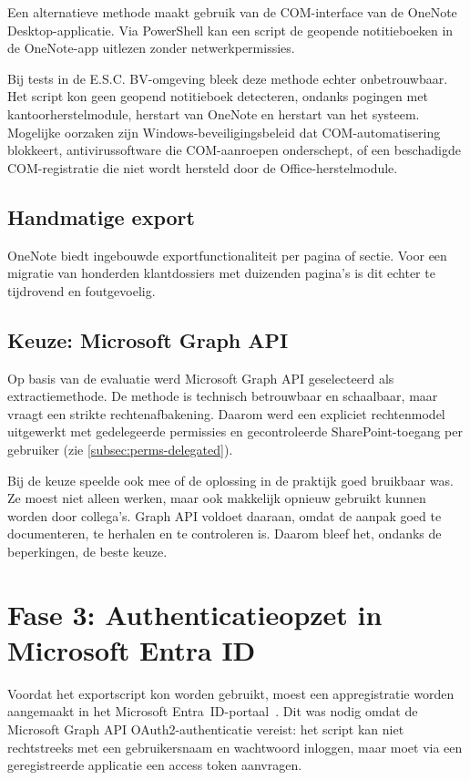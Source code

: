 Een alternatieve methode maakt gebruik van de COM-interface van de OneNote Desktop-applicatie. Via PowerShell kan een script de geopende notitieboeken in de OneNote-app uitlezen zonder netwerkpermissies.

Bij tests in de E.S.C. BV-omgeving bleek deze methode echter onbetrouwbaar. Het script kon geen geopend notitieboek detecteren, ondanks pogingen met kantoorherstelmodule, herstart van OneNote en herstart van het systeem. Mogelijke oorzaken zijn Windows-beveiligingsbeleid dat COM-automatisering blokkeert, antivirussoftware die COM-aanroepen onderschept, of een beschadigde COM-registratie die niet wordt hersteld door de Office-herstelmodule.

\subsection{Handmatige export}
\label{subsec:methode-manueel}

OneNote biedt ingebouwde exportfunctionaliteit per pagina of sectie. Voor een migratie van honderden klantdossiers met duizenden pagina's is dit echter te tijdrovend en foutgevoelig.

\subsection{Keuze: Microsoft Graph API}
\label{subsec:methode-keuze}

Op basis van de evaluatie werd Microsoft Graph API geselecteerd als extractiemethode. De methode is technisch betrouwbaar en schaalbaar, maar vraagt een strikte rechtenafbakening. Daarom werd een expliciet rechtenmodel uitgewerkt met gedelegeerde permissies en gecontroleerde SharePoint-toegang per gebruiker (zie \autoref{subsec:perms-delegated}).

Bij de keuze speelde ook mee of de oplossing in de praktijk goed bruikbaar was. Ze moest niet alleen werken, maar ook makkelijk opnieuw gebruikt kunnen worden door collega's. Graph API voldoet daaraan, omdat de aanpak goed te documenteren, te herhalen en te controleren is. Daarom bleef het, ondanks de beperkingen, de beste keuze.

\section{Fase 3: Authenticatieopzet in Microsoft Entra ID}
\label{sec:fase3-authenticatie}

Voordat het exportscript kon worden gebruikt, moest een appregistratie worden aangemaakt in het Microsoft Entra~ID-portaal~\autocite{microsoft2025entra}. Dit was nodig omdat de Microsoft Graph API OAuth2-authenticatie vereist: het script kan niet rechtstreeks met een gebruikersnaam en wachtwoord inloggen, maar moet via een geregistreerde applicatie een access token aanvragen.

